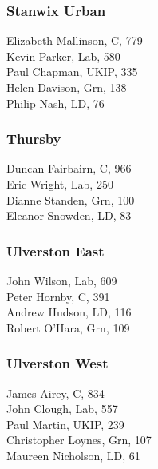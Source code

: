 \documentclass[a4paper,openany,10pt]{book}
\begin{document}
\subsubsection*{Stanwix Urban}



Elizabeth Mallinson, C, 779\\
Kevin Parker, Lab, 580\\
Paul Chapman, UKIP, 335\\
Helen Davison, Grn, 138\\
Philip Nash, LD, 76\\


\subsubsection*{Thursby}



Duncan Fairbairn, C, 966\\
Eric Wright, Lab, 250\\
Dianne Standen, Grn, 100\\
Eleanor Snowden, LD, 83\\


\subsubsection*{Ulverston East}



John Wilson, Lab, 609\\
Peter Hornby, C, 391\\
Andrew Hudson, LD, 116\\
Robert O'Hara, Grn, 109\\


\subsubsection*{Ulverston West}



James Airey, C, 834\\
John Clough, Lab, 557\\
Paul Martin, UKIP, 239\\
Christopher Loynes, Grn, 107\\
Maureen Nicholson, LD, 61\\
\end{document}
